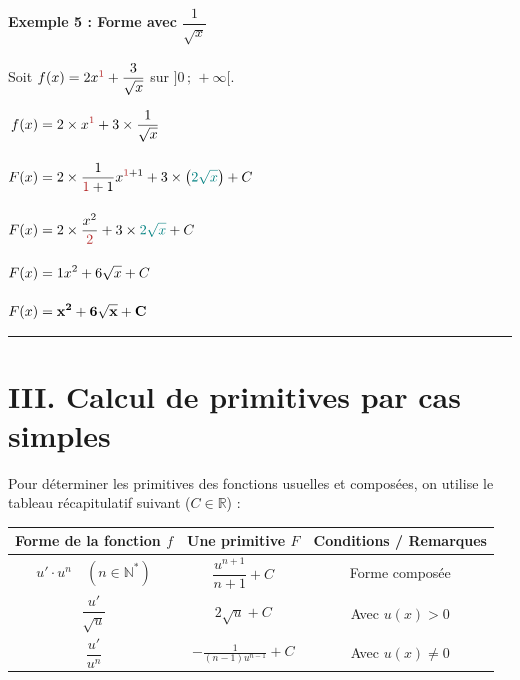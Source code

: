 \documentclass[12pt,a4paper]{article}
\begin{document}
\vspace{0.3cm}

\paragraph{Exemple 5 : Forme avec $\dfrac{1}{\sqrt{x}}$}
Soit $f(x) = 2x^{\color{myred}1} + \dfrac{3}{\sqrt{x}}$ sur $]0 \,;\, +\infty[$.

$
\begin{aligned}
f(x) &= 2 \times x^{\color{myred}1} + 3 \times \frac{1}{\sqrt{x}}\\[4mm]
F(x) &= 2 \times \dfrac{1}{{\color{myred}1}+1} x^{{\color{myred}1}+1} + 3 \times \left({\color{teal}2\sqrt{x}}\right) + C\\[4mm]
F(x) &= 2 \times \frac{x^2}{{\color{myred}2}} + 3 \times {\color{teal}2\sqrt{x}} + C\\[4mm]
F(x) &= 1x^2 + 6\sqrt{x} + C\\[4mm]
F(x) &= \mathbf{x^2 + 6\sqrt{x} + C}
\end{aligned}
$

\vspace{0.3cm}
\hrule
\vspace{0.3cm}


\section*{\color{myred}III. Calcul de primitives par cas simples}

Pour déterminer les primitives des fonctions usuelles et composées, on utilise le tableau récapitulatif suivant ($C \in \mathbb{R}$) :

\begin{center}
\renewcommand{\arraystretch}{2}
\begin{tabular}{|c|c|c|}
\hline
\textbf{Forme de la fonction } $f$ & \textbf{Une primitive } $F$ & \textbf{Conditions / Remarques} \\
\hline
$u' \cdot u^n \quad (n \in \mathbb{N}^*)$ & $\dfrac{u^{n+1}}{n+1} + C$ & Forme composée \\
\hline
$\dfrac{u'}{\sqrt{u}}$ & $2\sqrt{u} + C$ & Avec $u(x) > 0$ \\
\hline
$\dfrac{u'}{u^{n}}$ & $-\frac{1}{(n-1)u^{n-1}} + C$ & Avec $u(x) \neq 0$ \\
\hline
\end{tabular}
\end{center}
\end{document}
